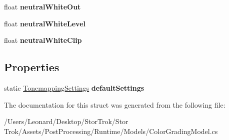 \begin{DoxyCompactItemize}
float {\bfseries neutral\+White\+Out}
\item 
\mbox{\label{struct_unity_engine_1_1_post_processing_1_1_color_grading_model_1_1_tonemapping_settings_a4f2e937233ddb0d540977b2ea1748137}} 
float {\bfseries neutral\+White\+Level}
\item 
\mbox{\label{struct_unity_engine_1_1_post_processing_1_1_color_grading_model_1_1_tonemapping_settings_a2433f12d9af67406a0117ea05e67f117}} 
float {\bfseries neutral\+White\+Clip}
\end{DoxyCompactItemize}
\subsection*{Properties}
\begin{DoxyCompactItemize}
\item 
\mbox{\label{struct_unity_engine_1_1_post_processing_1_1_color_grading_model_1_1_tonemapping_settings_afaaeaac01b5da1e740cf66a4e56abe7b}} 
static \hyperlink{struct_unity_engine_1_1_post_processing_1_1_color_grading_model_1_1_tonemapping_settings}{Tonemapping\+Settings} {\bfseries default\+Settings}
\end{DoxyCompactItemize}


The documentation for this struct was generated from the following file\+:\begin{DoxyCompactItemize}
\item 
/\+Users/\+Leonard/\+Desktop/\+Stor\+Trok/\+Stor Trok/\+Assets/\+Post\+Processing/\+Runtime/\+Models/Color\+Grading\+Model.\+cs\end{DoxyCompactItemize}
